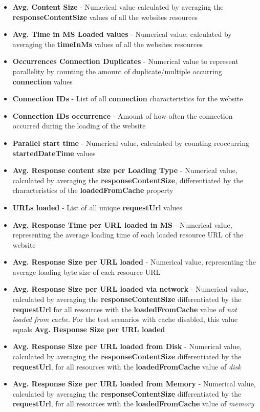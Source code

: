 \begin{itemize}
	\item \textbf{Avg. Content Size} - Numerical value calculated by averaging the \textbf{responseContentSize} values of all the websites resources
	\item \textbf{Avg. Time in MS Loaded values} - Numerical value, calculated by averaging the \textbf{timeInMs} values of all the websites resources
	\item \textbf{Occurrences Connection Duplicates} - Numerical value to represent parallelity by counting the amount of duplicate/multiple occurring \textbf{connection} values
	\item \textbf{Connection IDs} - List of all \textbf{connection} characteristics for the website 
	\item \textbf{Connection IDs occurrence} - Amount of how often the connection occurred during the loading of the website
	\item \textbf{Parallel start time} - Numerical value, calculated by counting reoccurring \textbf{startedDateTime} values
	\item \textbf{Avg. Response content size per Loading Type} - Numerical value, calculated by averaging the \textbf{responseContentSize}, differentiated by the characteristics of the \textbf{loadedFromCache} property
	\item \textbf{URLs loaded} - List of all unique \textbf{requestUrl} values
	\item \textbf{Avg. Response Time per URL loaded in MS} - Numerical value, representing the average loading time of each loaded resource URL of the website
	\item \textbf{Avg. Response Size per URL loaded} - Numerical value, representing the average loading byte size of each resource URL
	\item \textbf{Avg. Response Size per URL loaded via network} - Numerical value, calculated by averaging the \textbf{responseContentSize} differentiated by the \textbf{requestUrl} for all resources with the \textbf{loadedFromCache} value of \textit{not loaded from cache}. For the test scenarios with cache disabled, this value equals \textbf{Avg. Response Size per URL loaded}
	\item \textbf{Avg. Response Size per URL loaded from Disk} - Numerical value, calculated by averaging the \textbf{responseContentSize} differentiated by the \textbf{requestUrl}, for all resources with the \textbf{loadedFromCache} value of \textit{disk}
	\item \textbf{Avg. Response Size per URL loaded from Memory} - Numerical value, calculated by averaging the \textbf{responseContentSize} differentiated by the \textbf{requestUrl}, for all resources with the \textbf{loadedFromCache} value of \textit{memory}
\end{itemize}

